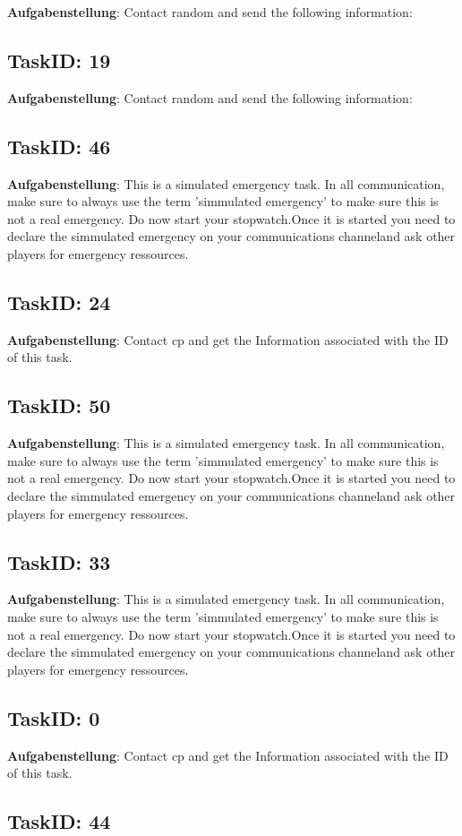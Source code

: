 \documentclass[12pt,a4paper]{scrreprt}
\begin{document}
\textbf{Aufgabenstellung}: Contact random and send the following information: \subsection{TaskID: 19}
\textbf{Aufgabenstellung}: Contact random and send the following information: \subsection{TaskID: 46}
\textbf{Aufgabenstellung}: This is a simulated emergency task. In all communication, make sure to always use the term 'simmulated emergency' to make sure this is not a real emergency. Do now start your stopwatch.Once it is started you need to declare the simmulated emergency on your communications channeland ask other players for emergency ressources.\subsection{TaskID: 24}
\textbf{Aufgabenstellung}: Contact {cp} and get the Information associated with the ID of this task.\subsection{TaskID: 50}
\textbf{Aufgabenstellung}: This is a simulated emergency task. In all communication, make sure to always use the term 'simmulated emergency' to make sure this is not a real emergency. Do now start your stopwatch.Once it is started you need to declare the simmulated emergency on your communications channeland ask other players for emergency ressources.\subsection{TaskID: 33}
\textbf{Aufgabenstellung}: This is a simulated emergency task. In all communication, make sure to always use the term 'simmulated emergency' to make sure this is not a real emergency. Do now start your stopwatch.Once it is started you need to declare the simmulated emergency on your communications channeland ask other players for emergency ressources.\subsection{TaskID: 0}
\textbf{Aufgabenstellung}: Contact {cp} and get the Information associated with the ID of this task.\subsection{TaskID: 44}
\end{document}
